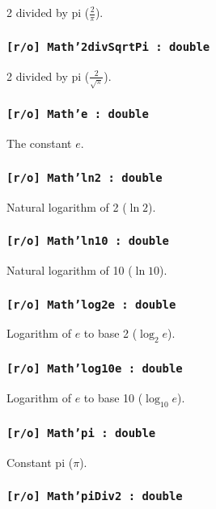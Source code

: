 2 divided by pi ($\frac{2}{\pi}$).

\subsubsection{\texttt{[r/o] Math'2divSqrtPi : double}}

2 divided by pi ($\frac{2}{\sqrt{\pi}}$).

\subsubsection{\texttt{[r/o] Math'e : double}}

The constant $e$.

\subsubsection{\texttt{[r/o] Math'ln2 : double}}

Natural logarithm of 2 ($\ln{2}$).

\subsubsection{\texttt{[r/o] Math'ln10 : double}}

Natural logarithm of 10 ($\ln{10}$).

\subsubsection{\texttt{[r/o] Math'log2e : double}}

Logarithm of $e$ to base 2 ($\log_{2}{e}$).

\subsubsection{\texttt{[r/o] Math'log10e : double}}

Logarithm of $e$ to base 10 ($\log_{10}{e}$).

\subsubsection{\texttt{[r/o] Math'pi : double}}

Constant pi ($\pi$).

\subsubsection{\texttt{[r/o] Math'piDiv2 : double}}

